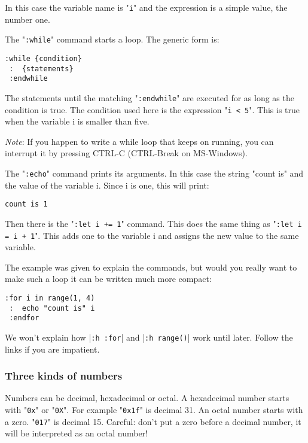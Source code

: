 In this case the variable name is "\texttt{i}" and the expression is a simple value, the number one.

The "\texttt{:while}" command starts a loop.
The generic form is:

\begin{Verbatim}[samepage=true]
 :while {condition}
 :  {statements}
 :endwhile
\end{Verbatim}

The statements until the matching "\texttt{:endwhile}" are executed for as long as the condition is true.
The condition used here is the expression "\texttt{i < 5}".
This is true when the variable i is smaller than five.

\emph{Note}: If you happen to write a while loop that keeps on running, you can interrupt it by pressing CTRL-C (CTRL-Break on MS-Windows).

The "\texttt{:echo}" command prints its arguments.
In this case the string "count is" and the value of the variable i.
Since i is one, this will print:

\begin{Verbatim}[samepage=true]
    count is 1
\end{Verbatim}

Then there is the "\texttt{:let i += 1}" command.
This does the same thing as "\texttt{:let i = i + 1}".
This adds one to the variable i and assigns the new value to the same variable.

The example was given to explain the commands, but would you really want to make such a loop it can be written much more compact:

\begin{Verbatim}[samepage=true]
 :for i in range(1, 4)
 :  echo "count is" i
 :endfor
\end{Verbatim}

We won't explain how |\texttt{:h :for}| and |\texttt{:h range()}| work until later.
Follow the links if you are impatient.

\subsubsection{Three kinds of numbers}
Numbers can be decimal, hexadecimal or octal.
A hexadecimal number starts with "\texttt{0x}" or "\texttt{0X}".
For example "\texttt{0x1f}" is decimal 31.
An octal number starts with a zero.
"\texttt{017}" is decimal 15.
Careful: don't put a zero before a decimal number, it will be interpreted as an octal number!


